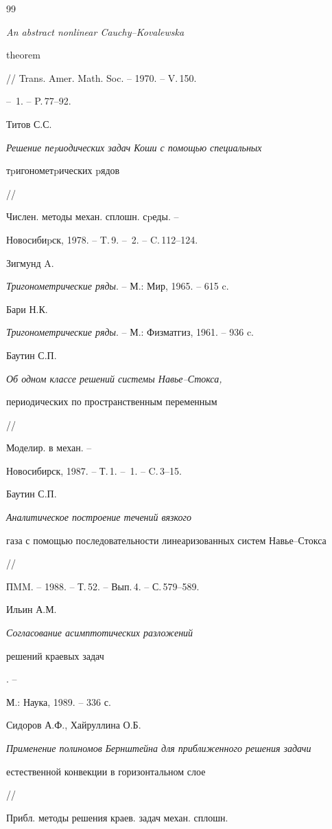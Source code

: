 \begin{thebibliography}{99}
{\em An abstract nonlinear Cauchy--Kovalewska


theorem} // Trans. Amer. Math. Soc. -- 1970. -- V.\,150.


-- \No\,1. -- P.\,77--92.




Титов С.С. {\em Решение пеpиодических задач Коши с помощью специальных


тpигонометpических pядов} //


Числен. методы механ. сплошн. сpеды. --


Новосибиpск, 1978. -- T.\,9. -- \No\,2. -- C.\,112--124.


 Зигмунд A. 


{\em Тригонометрические ряды}. -- М.: Мир, 1965. -- 615 c.


 Бари Н.К. 


{\em Тригонометрические ряды}. -- М.: Физматгиз, 1961. -- 936 c.




Баутин С.П. {\em Об одном классе решений системы Навье--Стокса,


периодических по пространственным переменным} //


Моделир. в механ. --


Новосибирск, 1987. -- Т.\,1. -- \No\,1. -- C.\,3--15.




Баутин С.П. 


{\em Аналитическое построение течений вязкого


газа с помощью последовательности линеаризованных систем Навье--Стокса} //


ПMM. -- 1988. -- Т.\,52. -- Вып.\,4. -- С.\,579--589.




Ильин А.М. 


{\em Согласование асимптотических разложений


решений краевых задач}. --


М.: Наука, 1989. -- 336 с.




Сидоров А.Ф., Хайруллина О.Б.


{\em Применение полиномов Бернштейна для приближенного решения задачи


естественной конвекции в горизонтальном слое} //


Прибл. методы решения краев. задач механ. сплошн. 



\end{thebibliography}
